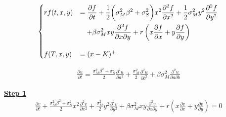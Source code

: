 \documentclass[12pt]{article}
\newenvironment{solution}[2][Solution]{\begin{trivlist}
\item[\hskip \labelsep {\bfseries #1}\hskip \labelsep {\bfseries #2.}]}{\end{trivlist}}
\newenvironment{question}[2][Question]{\begin{trivlist}
\item[\hskip \labelsep {\bfseries #1}\hskip \labelsep {\bfseries #2.}]}{\end{trivlist}}
\begin{document}
\newpage
\begin{question}{9}
\end{question}
\begin{solution}[Solution] \\ 
\begin{align*}
\begin{dcases}
    rf(t,x, y) &= \frac{\partial f}{\partial t} + \frac{1}{2}\bigg(\sigma_M^2 \beta^2 +\sigma_S^2\bigg)x^2 \frac{\partial^2 f}{\partial x^2} +\frac{1}{2}\sigma_M^2 y^2 \frac{\partial^2 f}{\partial y^2}  \\
    &\quad+ \beta\sigma_M^2 xy\frac{\partial^2 f}{\partial x \partial y} + r\left( x\frac{\partial f}{\partial x} +y\frac{\partial f}{\partial y} \right)\\[10pt]
    f(T,x,y)&=(x-K)^+
\end{dcases}
\end{align*}

\begin{align*}
    \frac{\partial u}{\partial t} = \frac{\sigma_M^2 \beta^2 + \sigma_S^2}{2}\frac{\partial^2 u}{\partial a^2} + \frac{\sigma_M^2}{2}\frac{\partial^2 u}{\partial b^2} + \beta \sigma_M^2 \frac{\partial^2 u}{\partial a \partial b}
\end{align*}

\newpage
\textbf{\underline{Step 1}}
\begin{align*}
    \frac{\partial v}{\partial t} + \frac{\sigma_M^2 \beta^2 +\sigma_S^2}{2}x^2 \frac{\partial^2 v}{\partial x^2} +\frac{\sigma_M^2}{2}y^2 \frac{\partial^2 v}{\partial y^2} + \beta\sigma_M^2 xy\frac{\partial^2 v}{\partial x \partial y} + r\left( x\frac{\partial v}{\partial x} +y\frac{\partial v}{\partial y} \right) = 0
\end{align*}


\end{solution}
\end{document}
